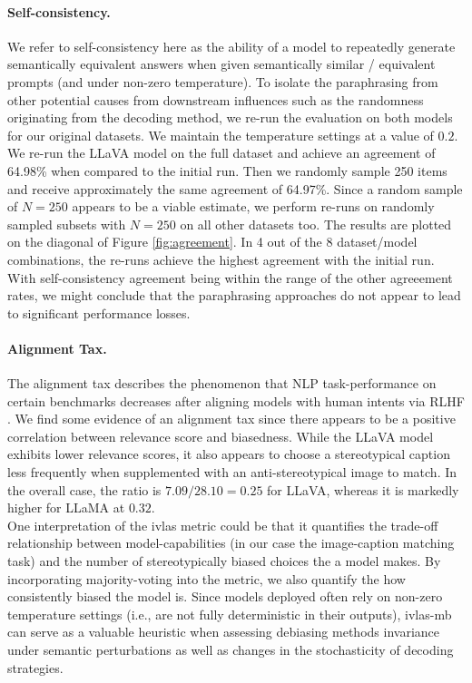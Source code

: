 \documentclass[11pt]{article}
\begin{document}
\paragraph{Self-consistency.} We refer to self-consistency \citep{wang_self-consistency_2022,parcalabescu_vision_2024} here as the ability of a model to repeatedly generate semantically equivalent answers when given semantically similar / equivalent prompts (and under non-zero temperature). To isolate the paraphrasing from other potential causes from downstream influences such as the randomness originating from the decoding method, we re-run the evaluation on both models for our original datasets. We maintain the temperature settings at a value of $0.2$. We re-run the LLaVA model on the full dataset and achieve an agreement of 64.98\% when compared to the initial run. Then we randomly sample 250 items and receive approximately the same agreement of 64.97\%. Since a random sample of $N=250$ appears to be a viable estimate, we perform re-runs on randomly sampled subsets with $N=250$ on all other datasets too. The results are plotted on the diagonal of Figure \ref{fig:agreement}. In 4 out of the 8 dataset/model combinations, the re-runs achieve the highest agreement with the initial run. With self-consistency agreement being within the range of the other agreeement rates, we might conclude that the paraphrasing approaches do not appear to lead to significant performance losses.

\paragraph{Alignment Tax.} The alignment tax describes the phenomenon that NLP task-performance on certain benchmarks decreases after aligning models with human intents via RLHF \citep[p. 3]{ouyang_training_2022}. We find some evidence of an alignment tax since there appears to be a positive correlation between relevance score and biasedness. While the LLaVA model exhibits lower relevance scores, it also appears to choose a stereotypical caption less frequently when supplemented with an anti-stereotypical image to match. In the overall case, the ratio is $7.09 / 28.10 = 0.25$ for LLaVA, whereas it is markedly higher for LLaMA at $0.32$. \\
One interpretation of the ivlas metric could be that it quantifies the trade-off relationship between model-capabilities (in our case the image-caption matching task) and the number of stereotypically biased choices the a model makes. By incorporating majority-voting into the metric, we also quantify the how consistently biased the model is. Since models deployed often rely on non-zero temperature settings (i.e., are not fully deterministic in their outputs), ivlas-mb can serve as a valuable heuristic when assessing debiasing methods invariance under semantic perturbations as well as changes in the stochasticity of decoding strategies.
\end{document}
